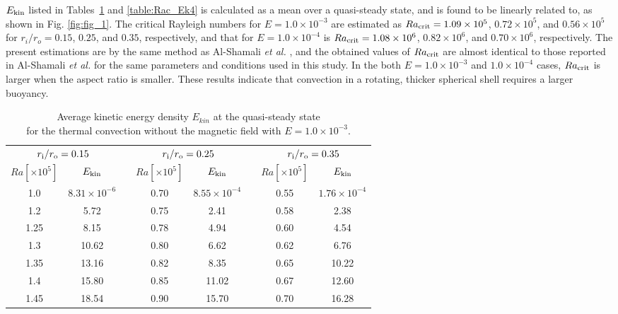 $E_{\rm kin}$ listed in 
{\color{blue} Tables~\ref{table:Rac} and \ref{table:Rac_Ek4}} is calculated as a mean over a quasi-steady state, and is found to be linearly related to, as shown in Fig. \ref{fig:fig_1}.
The critical Rayleigh numbers 
{\color{blue} for $E = 1.0 \times 10^{-3}$}
are estimated as $Ra_{\rm crit} = 1.09 \times 10^5$, $0.72 \times 10^5$, and $0.56 \times 10^5$ for $r_i/r_o = 0.15$, $0.25$, and $0.35$, respectively, 
{\color{blue} and that for $E = 1.0 \times 10^{-4}$ is  $Ra_{\rm crit} = 1.08 \times 10^6$, $0.82 \times 10^6$, and $0.70 \times 10^6$, respectively.
The present estimations are by the same method as Al-Shamali {\it et al.} , and}
the obtained values of $Ra_{\rm crit}$ are almost identical to those reported in Al-Shamali {\it et al.}  for the same parameters and conditions used in this study. 
{\color{blue} In the both $E = 1.0 \times 10^{-3}$ and $1.0 \times 10^{-4}$ cases,}
{\color{red} %
$Ra_{\rm crit}$ is larger when the aspect ratio is smaller. These results indicate that convection in a rotating, thicker spherical shell requires a larger buoyancy.
}
%
%
\begin{table}
\caption{Average kinetic energy density $E_{kin}$ at the quasi-steady state \\
for the thermal convection without the magnetic field with $E = 1.0 \times 10^{-3}$.}
\begin{center}
\begin{tabular}{|ccc|ccc|cc|}
   \hline
  \multicolumn{2}{|c|}{$r_{\rm i}/r_{\rm o} = 0.15$} & \hspace{5mm} &
  \multicolumn{2}{|c|}{$r_{\rm i}/r_{\rm o} = 0.25$} & \hspace{5mm} &
  \multicolumn{2}{|c|}{$r_{\rm i}/r_{\rm o} = 0.35$} \\
  $Ra[\times 10^5] $ &  $E_{\rm kin}$ & &
  $Ra[\times 10^5] $ &  $E_{\rm kin}$ & &
  $Ra[\times 10^5] $ &  $E_{\rm kin}$ \\
    \hline
   1.0  &  $8.31 \times 10^{-6} $ & &  0.70 &  $8.55 \times 10^{-4}$ & &  0.55  &  $1.76 \times 10^{-4}$ \\
   1.2  &  5.72 & & 0.75 &  2.41 & &  0.58  &  2.38\\
   1.25 &  8.15 & &  0.78  &  4.94 & &  0.60  &  4.54\\
   1.3  &  10.62 & &  0.80  &  6.62 & &  0.62  &  6.76  \\
   1.35 &  13.16 & &  0.82  & 8.35 & &  0.65  &  10.22 \\
   1.4  &  15.80 & &  0.85  &  11.02 & &  0.67  &  12.60 \\
   1.45  &  18.54 & &  0.90  &  15.70 & &  0.70  &  16.28\\
 \hline
\end{tabular}
\end{center}
\label{table:Rac}
\end{table}


